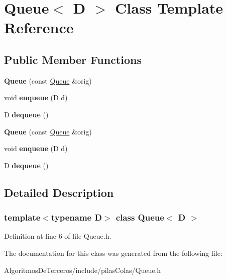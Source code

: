 \hypertarget{class_queue}{}\section{Queue$<$ D $>$ Class Template Reference}
\label{class_queue}
\subsection*{Public Member Functions}
\begin{DoxyCompactItemize}
\item 
\mbox{\label{class_queue_a24f783b719e19d65b3ee5a98b6daee3a}} 
{\bfseries Queue} (const \hyperlink{class_queue}{Queue} \&orig)
\item 
\mbox{\label{class_queue_a80e37c5fc154e7a3788b6b25bb7399b8}} 
void {\bfseries enqueue} (D d)
\item 
\mbox{\label{class_queue_ae3a41c4439bb5914acce8ef329a05512}} 
D {\bfseries dequeue} ()
\item 
\mbox{\label{class_queue_a24f783b719e19d65b3ee5a98b6daee3a}} 
{\bfseries Queue} (const \hyperlink{class_queue}{Queue} \&orig)
\item 
\mbox{\label{class_queue_a80e37c5fc154e7a3788b6b25bb7399b8}} 
void {\bfseries enqueue} (D d)
\item 
\mbox{\label{class_queue_ae3a41c4439bb5914acce8ef329a05512}} 
D {\bfseries dequeue} ()
\end{DoxyCompactItemize}


\subsection{Detailed Description}
\subsubsection*{template$<$typename D$>$\newline
class Queue$<$ D $>$}



Definition at line 6 of file Queue.\+h.



The documentation for this class was generated from the following file\+:\begin{DoxyCompactItemize}
\item 
Algoritmos\+De\+Terceros/include/pilas\+Colas/Queue.\+h\end{DoxyCompactItemize}
